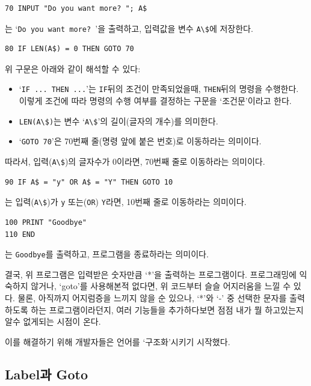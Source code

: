 \documentclass[a4paper,12pt]{book}
\newcommand{\V}[1]{\Verb|#1|}
\begin{document}
\begin{lstlisting}
70 INPUT "Do you want more? "; A$
\end{lstlisting}

는 `\V{Do you want more? }'을 출력하고,
입력값을 변수 \V{A\$}에 저장한다.

\begin{lstlisting}
80 IF LEN(A$) = 0 THEN GOTO 70
\end{lstlisting}

위 구문은 아래와 같이 해석할 수 있다:

\begin{itemize}
    \item `\V{IF ... THEN ...}'는 \V{IF}뒤의 조건이 만족되었을때,
    \V{THEN}뒤의 명령을 수행한다.
    이렇게 조건에 따라 명령의 수행 여부를 결정하는 구문을 `조건문'이라고 한다.
    \item \V{LEN(A\$)}는 변수 `\V{A\$}'의 길이(글자의 개수)를 의미한다.
    \item `\V{GOTO 70}'은 70번째 줄(명령 앞에 붙은 번호)로 이동하라는 의미이다.
\end{itemize}

따라서, 입력(\V{A\$})의 글자수가 0이라면, 70번째 줄로 이동하라는 의미이다.

\begin{lstlisting}
90 IF A$ = "y" OR A$ = "Y" THEN GOTO 10
\end{lstlisting}

는 입력(\V{A\$})가 \V{y} 또는(\V{OR}) \V{Y}라면, 10번째 줄로 이동하라는 의미이다.

\begin{lstlisting}
100 PRINT "Goodbye"
110 END
\end{lstlisting}

는 \V{Goodbye}를 출력하고, 프로그램을 종료하라는 의미이다.

결국, 위 프로그램은 입력받은 숫자만큼 `*'을 출력하는 프로그램이다.
프로그래밍에 익숙하지 않거나, `goto'를 사용해본적 없다면, 위 코드부터 슬슬 어지러움을 느낄 수 있다.
물론, 아직까지 어지럼증을 느끼지 않을 순 있으나, `*'와 `-' 중 선택한 문자를 출력하도록 하는 프로그램이라던지,
여러 기능들을 추가하다보면 점점 내가 뭘 하고있는지 알수 없게되는 시점이 온다.

이를 해결하기 위해 개발자들은 언어를 `구조화'시키기 시작했다.


\subsection{Label과 Goto}
\end{document}
